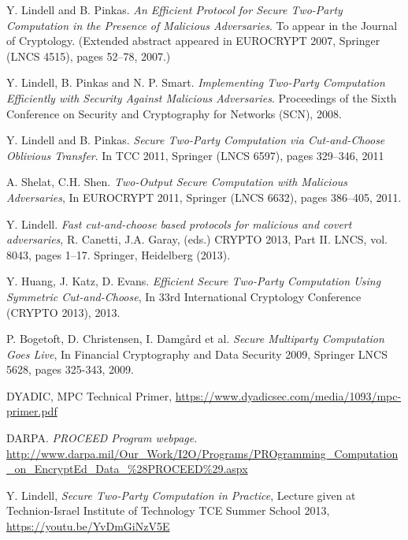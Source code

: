 \documentclass[ %
                    author={Nicholas Tutte},
                supervisor={Prof. Nigel Smart},
                    degree={MEng},
                     title={Secure Two Party Computation},
                  subtitle={A practical comparison of recent protocols},
                      type={Research - GG1K},
                      year={2015} ]{dissertation}
\begin{document}
	\begin{thebibliography}{99}

			Y. Lindell and B. Pinkas. \emph{An Efficient Protocol for Secure Two-Party Computation in the Presence of Malicious Adversaries}.
			To appear in the Journal of Cryptology. (Extended abstract appeared in EUROCRYPT 2007, Springer (LNCS 4515), pages 52–78, 2007.)

			Y. Lindell, B. Pinkas and N. P. Smart.
			\emph{Implementing Two-Party Computation Efficiently with Security Against Malicious Adversaries}. Proceedings of the Sixth Conference on Security and Cryptography for Networks (SCN),
			2008.

			Y. Lindell and B. Pinkas. \emph{Secure Two-Party Computation via Cut-and-Choose Oblivious Transfer}.
			In TCC 2011,
			Springer (LNCS 6597), pages 329–346,
			2011

			A. Shelat, C.H. Shen. \emph{Two-Output Secure Computation with Malicious Adversaries},
			In EUROCRYPT 2011,
			Springer (LNCS 6632), pages 386–405,
			2011.

			Y. Lindell.
			\emph{Fast cut-and-choose based protocols for malicious and covert adversaries}, R. Canetti, J.A. Garay, (eds.)
			CRYPTO 2013, Part II. LNCS, vol. 8043, pages 1–17.
			Springer, Heidelberg (2013).

			Y. Huang, J. Katz, D. Evans.
			\emph{Efficient Secure Two-Party Computation Using Symmetric Cut-and-Choose}, In 33rd International Cryptology Conference (CRYPTO 2013),
			2013.

			P. Bogetoft, D. Christensen, I. Damgård et al.
			\emph{Secure Multiparty Computation Goes Live},
			In Financial Cryptography and Data Security 2009,
			Springer LNCS 5628, pages 325-343,
			2009.

			DYADIC,
			MPC Technical Primer,
			\url{https://www.dyadicsec.com/media/1093/mpc-primer.pdf}

			DARPA.
			\emph{PROCEED Program webpage}.
			\url{http://www.darpa.mil/Our_Work/I2O/Programs/PROgramming_Computation_on_EncryptEd_Data_%28PROCEED%29.aspx}

			Y. Lindell,
			\emph{Secure Two-Party Computation in Practice},
			Lecture given at Technion-Israel Institute of Technology TCE Summer School 2013,
			\url{https://youtu.be/YvDmGiNzV5E}


\end{thebibliography}
\end{document}
